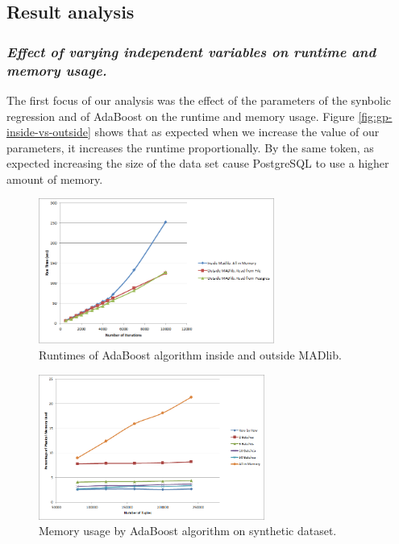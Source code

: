 
\subsection{Result analysis}
\subsubsection*{\itshape Effect of varying independent variables on runtime and memory usage.}

The first focus of our analysis was the effect of the parameters of the synbolic regression and of AdaBoost on the runtime and memory usage. Figure \ref{fig:gp-inside-vs-outside} shows that as expected when we increase the value of our parameters, it increases the runtime proportionally. By the same token, as expected increasing the size of the data set cause PostgreSQL to use a higher amount of memory.


\begin{figure}[ht]
\centering
\includegraphics[height=180px]{ada1.png}
\caption{Runtimes of AdaBoost algorithm inside and outside MADlib.}
\label{fig:adainout}
\end{figure}


\begin{figure}[ht]
\centering
\includegraphics[height=180px]{ada4.png}
\caption{Memory usage by AdaBoost algorithm on synthetic dataset.}
\label{fig:adamem}
\end{figure}

